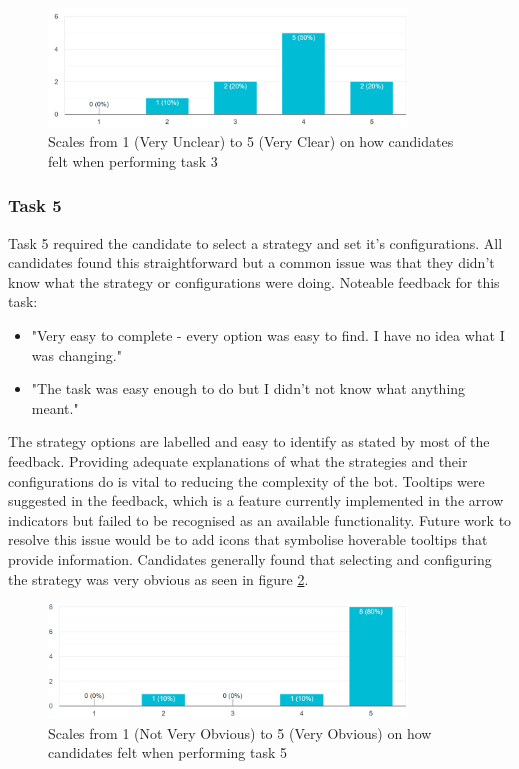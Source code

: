 \begin{figure}[ht]
  \centering
 \includegraphics[width=0.85\textwidth]{content/graphics/task3_clarity.PNG}
  \caption{Scales from 1 (Very Unclear) to 5 (Very Clear) on how candidates felt when performing task 3}
  \label{fig:eval:web_app:task3_clarity}
\end{figure}


\subsubsection{Task 5}
\label{sec:evaluation:ui:tasks:q5}
Task 5 required the candidate to select a strategy and set it's configurations. All candidates found this straightforward but a common issue was that they didn't know what the strategy or configurations were doing. Noteable feedback for this task:
\begin{itemize}
\item "Very easy to complete - every option was easy to find. I have no idea what I was changing."
\item "The task was easy enough to do but I didn't not know what anything meant."
\end{itemize}
The strategy options are labelled and easy to identify as stated by most of the feedback. Providing adequate explanations of what the strategies and their configurations do is vital to reducing the complexity of the bot. Tooltips were suggested in the feedback, which is a feature currently implemented in the arrow indicators but failed to be recognised as an available functionality. Future work to resolve this issue would be to add icons that symbolise hoverable tooltips that provide information. Candidates generally found that selecting and configuring the strategy was very obvious as seen in figure \ref{fig:eval:web_app:task5_obvious}.

\begin{figure}[ht]
  \centering
 \includegraphics[width=0.85\textwidth]{content/graphics/task5_obvious.PNG}
  \caption{Scales from 1 (Not Very Obvious) to 5 (Very Obvious) on how candidates felt when performing task 5}
  \label{fig:eval:web_app:task5_obvious}
\end{figure}

